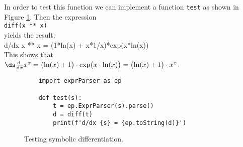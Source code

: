 In order to test this function we can implement a function \texttt{test} as shown in Figure \ref{fig:test-diff.py}.
Then the expression
\\[0.2cm]
\hspace*{1.3cm}
\texttt{diff(x ** x)}
\\[0.2cm]
yields the result:
\\[0.2cm]
\hspace*{1.3cm}
d/dx x ** x = (1*ln(x) + x*1/x)*exp(x*ln(x))
\\[0.2cm]
This shows that
\\[0.2cm]
\hspace*{1.3cm}
$\ds \frac{\mathrm{d}\;}{\mathrm{d}x} x^x = \bigl(\ln(x) + 1\bigr) \cdot \exp\bigl(x \cdot \ln(x)\bigr) =
 \bigl(\ln(x) + 1\bigr) \cdot x^x
$.


\begin{figure}[!ht]
\centering
\begin{verbatim}
    import exprParser as ep

    def test(s):
        t = ep.ExprParser(s).parse()
        d = diff(t)
        print(f'd/dx {s} = {ep.toString(d)}')
\end{verbatim}
\vspace*{-0.3cm}
\caption{Testing symbolic differentiation.}
\label{fig:test-diff.py}
\end{figure}





